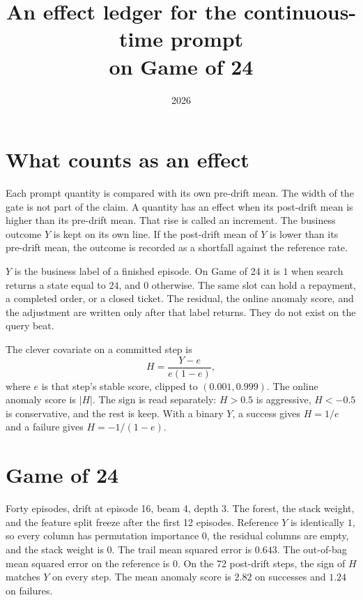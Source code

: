 \documentclass[11pt,a4paper]{article}
\title{An effect ledger for the continuous-time prompt\\on Game of 24}
\author{}
\date{2026}
\begin{document}
\maketitle

\section{What counts as an effect}
Each prompt quantity is compared with its own pre-drift mean.
The width of the gate is not part of the claim.
A quantity has an effect when its post-drift mean is higher than its pre-drift mean.
That rise is called an increment.
The business outcome \(Y\) is kept on its own line.
If the post-drift mean of \(Y\) is lower than its pre-drift mean, the outcome is recorded as a shortfall against the reference rate.

\(Y\) is the business label of a finished episode.
On Game of 24 it is \(1\) when search returns a state equal to \(24\), and \(0\) otherwise.
The same slot can hold a repayment, a completed order, or a closed ticket.
The residual, the online anomaly score, and the adjustment are written only after that label returns.
They do not exist on the query beat.

The clever covariate on a committed step is
\[
H=\frac{Y-e}{e(1-e)},
\]
where \(e\) is that step's stable score, clipped to \((0.001,0.999)\).
The online anomaly score is \(|H|\).
The sign is read separately: \(H>0.5\) is aggressive, \(H<-0.5\) is conservative, and the rest is keep.
With a binary \(Y\), a success gives \(H=1/e\) and a failure gives \(H=-1/(1-e)\).

\section{Game of 24}
Forty episodes, drift at episode 16, beam 4, depth 3.
The forest, the stack weight, and the feature split freeze after the first 12 episodes.
Reference \(Y\) is identically \(1\), so every column has permutation importance \(0\), the residual columns are empty, and the stack weight is \(0\).
The trail mean squared error is \(0.643\).
The out-of-bag mean squared error on the reference is \(0\).
On the 72 post-drift steps, the sign of \(H\) matches \(Y\) on every step.
The mean anomaly score is \(2.82\) on successes and \(1.24\) on failures.
\end{document}

